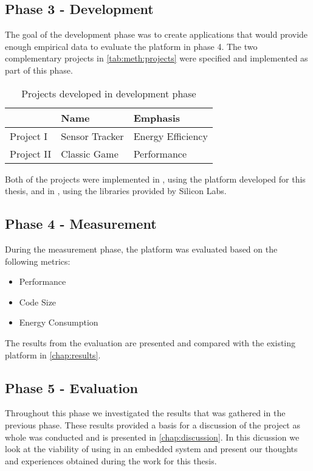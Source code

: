 \subsection{Phase 3 - Development}
\label{sec:projects}

The goal of the development phase was to create applications that would provide enough empirical data to evaluate the platform in phase 4.
The two complementary projects in \autoref{tab:meth:projects} were specified and implemented as part of this phase.

\begin{table}[H]
  \centering
  \begin{tabular}{l|l|l}
    & \textbf{Name} & \textbf{Emphasis} \\
    \hline
    Project I & Sensor Tracker & Energy Efficiency \\
    Project II & Classic Game & Performance \\
    \hline
  \end{tabular}
  \caption{Projects developed in development phase}
  \label{tab:meth:projects}
\end{table}

Both of the projects were implemented in {\rust}, using the platform developed for this thesis, and in {\C}, using the libraries provided by Silicon Labs.

\subsection{Phase 4 - Measurement}
During the measurement phase, the platform was evaluated based on the following metrics:

\begin{itemize}
  \item Performance
  \item Code Size
  \item Energy Consumption
\end{itemize}

The results from the evaluation are presented and compared with the existing {\C} platform in \autoref{chap:results}.

\subsection{Phase 5 - Evaluation}


Throughout this phase we investigated the results that was gathered in the previous phase.
These results provided a basis for a discussion of the project as whole was conducted and is presented in \autoref{chap:discussion}.
In this dicussion we look at the viability of using {\rust} in an embedded system and present our thoughts and experiences obtained during the work for this thesis.
